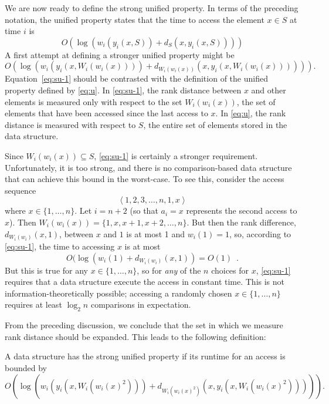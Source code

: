 \documentclass{llncs}
\newcommand{\BigOh}[1]{O\!\left(#1\right)}
\begin{document}
We are now ready to define the strong unified property. In terms of the preceding notation, the unified property states that the time to access the element $x \in S$ at time $i$ is 
\begin{equation}
	\BigOh{\log (w_i(y_i(x,S)) + d_S(x,y_i(x,S)))}
        \label{eq:u}
\end{equation}
%
A first attempt at defining a stronger unified property might be 
\begin{equation}
	\BigOh{\log (w_i(y_i(x,W_i(w_i(x)))) + d_{W_i(w_i(x))}(x,y_i(x,W_i(w_i(x)))))}. \label{eq:su-1}
\end{equation}
Equation~\eqref{eq:su-1} should be contrasted with the definition of the unified property defined by \eqref{eq:u}.  In \eqref{eq:su-1}, the rank distance between $x$ and other elements is measured only with respect to the set $W_i(w_i(x))$, the set of elements that have been accessed since the last access to $x$.  In \eqref{eq:u}, the rank distance is measured with respect to $S$, the entire set of elements stored in the data structure.

Since $W_i(w_i(x))\subseteq S$, \eqref{eq:su-1} is certainly a stronger requirement.  Unfortunately, it is too strong, and there is no comparison-based data structure that can achieve this bound in the worst-case. To see this, consider the access sequence
\begin{displaymath}
	\left\langle 1,2,3,\ldots,n,1,x \right\rangle
\end{displaymath}
where $x \in \{1,\ldots,n\}$.  Let $i={n+2}$ (so that $a_i =x$ represents the second access to $x$).  Then $W_i(w_i(x)) = \{1,x,x+1,x+2,\ldots,n\}$.  But then the rank difference, $d_{W_i(w_i)}(x,1)$, between $x$ and $1$ is at most 1 and $w_i(1)=1$, so, according to \eqref{eq:su-1}, the time to accessing $x$ is at most\[
   O(\log(w_i(1)+d_{W_i(w_i)}(x,1)) = O(1) \enspace .
\]
But this is true for any $x\in\{1,\ldots,n\}$, so for \emph{any} of the $n$ choices for $x$, \eqref{eq:su-1} requires that a data structure execute the access in constant time. This is not information-theoretically possible; accessing a randomly chosen $x\in\{1,\ldots,n\}$ requires at least $\log_2 n$ comparisons in expectation.  %

From the preceding discussion, we conclude that the set in which we measure rank distance should be expanded.  This leads to the following definition:

\begin{definition} A data structure has the strong unified property if its runtime for an access is bounded by
\begin{displaymath}
	\BigOh{\log (w_i(y_i(x,W_i(w_i(x)^2))) + d_{W_i(w_i(x)^2)}(x,y_i(x,W_i(w_i(x)^2))))}.
\end{displaymath}
\end{definition}
\end{document}
